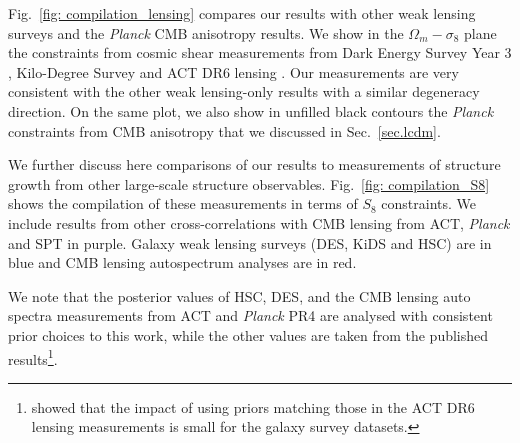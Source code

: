 \documentclass[twocolumn]{aastex631}
\begin{document}
{Fig.~\ref{fig: compilation_lensing} compares our results with other weak lensing surveys and the \textit{Planck} CMB anisotropy results. 
We show in the $\Omega_m - \sigma_8$ plane the constraints from cosmic shear measurements from Dark Energy Survey Year 3 \citep[DES Y3; ][]{2022PhRvD.105b3514A,2022PhRvD.105b3515S}, Kilo-Degree Survey \citep[KiDS 1000; ][]{2021A&A...645A.104A} and ACT DR6 lensing \citep{qu2023atacama}. Our measurements are very consistent with the other weak lensing-only results with a similar degeneracy direction. 
On the same plot, we also show in unfilled black contours the \textit{Planck} constraints from CMB anisotropy that we discussed in Sec.~\ref{sec.lcdm}.



We further discuss here comparisons of our results to measurements of structure growth from other large-scale structure observables. Fig.~\ref{fig: compilation_S8} shows the compilation of these measurements in terms of $S_8$ constraints. 
We include results from other cross-correlations with CMB lensing from ACT, \textit{Planck} and SPT in purple. Galaxy weak lensing surveys (DES, KiDS and HSC) are in blue and CMB lensing autospectrum analyses are in red.

\noindent We note that the posterior values of  HSC, DES, and the CMB lensing auto spectra measurements from ACT and \textit{Planck} PR4 are analysed with consistent prior choices to this work, while the other values are taken from the published results\footnote{\cite{ACT:2023kun} showed that the impact of using priors matching those in the ACT DR6 lensing measurements is small for the galaxy survey datasets.}.

}
\end{document}
